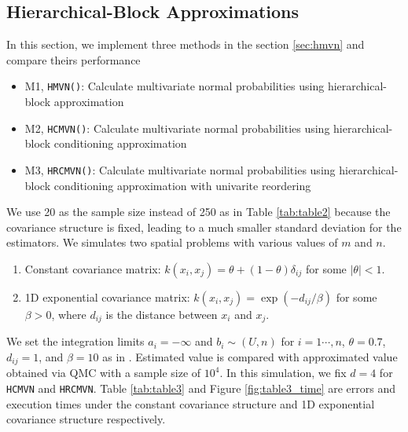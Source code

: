 \subsection{Hierarchical-Block Approximations}

In this section, we implement three methods in the section \ref{sec:hmvn} and compare theirs performance
\begin{itemize}
    \item M1, \texttt{HMVN()}: Calculate multivariate normal probabilities using hierarchical-block approximation
    \item M2, \texttt{HCMVN()}: Calculate multivariate normal probabilities using hierarchical-block conditioning approximation
    \item M3, \texttt{HRCMVN()}: Calculate multivariate normal probabilities using hierarchical-block conditioning approximation with univarite reordering
\end{itemize}

We use 20 as the sample size instead of 250 as in Table \ref{tab:table2} because the covariance structure is ﬁxed, leading to a much smaller standard deviation for the estimators. We simulates two spatial problems with various values of $m$ and $n$.

\begin{enumerate}
	\item Constant covariance matrix: $k(x_i, x_j) = \theta + (1-\theta)\delta_{ij}$ for some $|\theta| < 1$.
	\item 1D exponential covariance matrix: $k(x_i, x_j) = \exp(-d_{ij}/\beta)$ for some $\beta > 0$, where $d_{ij}$ is the distance between $x_i$ and $x_j$.
\end{enumerate}

We set the integration limits $a_i=-\infty$ and $b_i\sim(U,n)$ for $i=1\cdots,n$, $\theta=0.7$, $d_{ij} = 1$, and $\beta=10$ as in \citet{cao2019hierarchical}. Estimated value is compared with approximated value obtained via QMC with a sample size of $10^4$. In this simulation, we fix $d=4$ for \texttt{HCMVN} and \texttt{HRCMVN}. Table \ref{tab:table3} and Figure \ref{fig:table3_time} are errors and execution times under the constant covariance structure and 1D exponential covariance structure respectively. 


